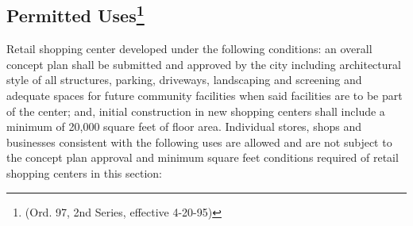 \subsection{Permitted Uses\footnote{(Ord. 97, 2nd Series, effective 4-20-95)}}
Retail shopping center developed under the following conditions: an overall concept plan shall be submitted and approved by the city including architectural style of all structures, parking, driveways, landscaping and screening and adequate spaces for future community facilities when said facilities are to be part of the center; and, initial construction in new shopping centers shall include a minimum of 20,000 square feet of floor area. Individual stores, shops and businesses consistent with the following uses are allowed and are not subject to the concept plan approval and minimum square feet conditions required of retail shopping centers in this section:
